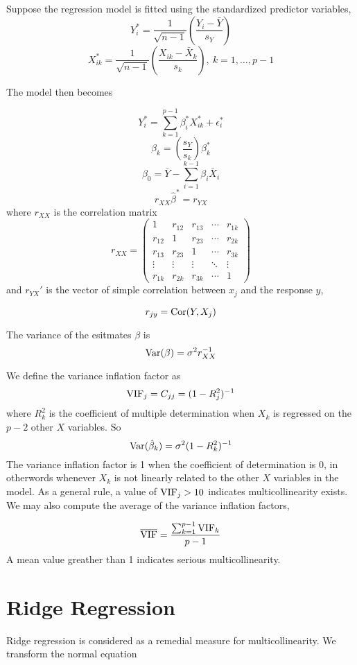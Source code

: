 Suppose the regression model is fitted using the standardized predictor variables, 
\[Y_i^* = \frac{1}{\sqrt{n-1}}\left(\frac{Y_i - \bar{Y}}{s_Y}\right)\]
\[X_{ik}^* = \frac{1}{\sqrt{n-1}}\left(\frac{X_{ik} - \bar{X}_k}{s_k}\right), \ k = 1, \ldots, p-1\]

The model then becomes

\[Y_i^* = \sum_{k=1}^{p-1} \beta_i^*X_{ik}^* + \epsilon_i^*\]
\[\beta_k = \left(\frac{s_Y}{s_k}\right)\beta_k^*\]
\[\beta_0 = \bar{Y} - \sum_{i=1}^{k-1}\beta_i\bar{X}_i\]
\[r_{XX}\hat{\beta}^* = r_{YX}\]
where $r_{XX}$ is the correlation matrix 
\[r_{XX} = \begin{pmatrix}
    1 & r_{12} & r_{13} & \cdots & r_{1k}\\
    r_{12} & 1 & r_{23} & \cdots & r_{2k}\\
    r_{13} & r_{23} & 1 & \cdots & r_{3k} \\
    \vdots & \vdots & \vdots & \ddots & \vdots \\
    r_{1k} & r_{2k} & r_{3k} & \cdots & 1 
\end{pmatrix}\]
and $r_{YX}'$ is the vector of simple correlation between $x_j$ and the response $y$, 

\[r_{jy} = \operatorname{Cor}(Y, X_j)\]

The variance of the esitmates $\beta$ is 
\[\operatorname{Var}(\beta) = \sigma^2r_{XX}^{-1}\]

We define the variance inflation factor as 
\[\operatorname{VIF}_j = C_{jj} = (1-R_j^2)^{-1}\]
where $R_k^2$ is the coefficient of multiple determination when $X_k$ is regressed on the $p-2$ other $X$ variables. So 
\[\operatorname{Var}(\hat{\beta}_k) = \sigma^2(1- R_k^{2})^{-1}\]
The variance inflation factor is 1 when the coefficient of determination is 0, in otherwords whenever $X_k$ is not linearly related to the other $X$ variables in the model. As a general rule, a value of $\operatorname{VIF}_j > 10$ indicates multicollinearity exists. We may also compute the average of the variance inflation factors,

\[\overline{\operatorname{VIF}} = \frac{\sum_{k=1}^{p-1}\operatorname{VIF}_k}{p-1}\]
\noindent
A mean value greather than 1 indicates serious multicollinearity.

\section{Ridge Regression}

Ridge regression is considered as a remedial measure for multicollinearity. We transform the normal equation 

